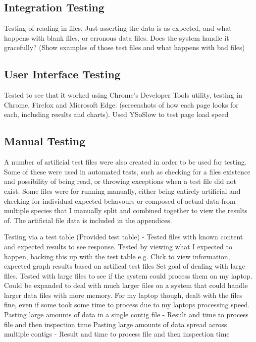 
\subsection{Integration Testing}
Testing of reading in files. Just asserting the data is as expected, and what happens with blank files, or erronous data files. Does the system handle it gracefully? (Show examples of those test files and what happens with bad files)


\subsection{User Interface Testing}
Tested to see that it worked using Chrome's Developer Tools utility, testing in Chrome, Firefox and Microsoft Edge. (screenshots of how each page looks for each, including results and charts). Used YSoSlow to test page load speed


\subsection{Manual Testing}
A number of artificial test files were also created in order to be used for testing. Some of these were used in automated tests, such as checking for a files existence and possibility of being read, or throwing exceptions when a test file did not exist. Some files were for running manually, either being entirely artificial and checking for individual expected behavours or composed of actual data from multiple species that I manually split and combined together to view the results of. The artificial file data is included in the appendices.

Testing via a test table (Provided test table) - Tested files with known content and expected results to see response. Tested by viewing what I expected to happen, backing this up with the test table e.g. Click to view information, expected graph results based on artifical test files
Set goal of dealing with large files. Tested with large files to see if the system could process them on my laptop. Could be expanded to deal with much larger files on a system that could handle larger data files with more memory. For my laptop though, dealt with the files fine, even if some took some time to process due to my laptops processing speed.
Pasting large amounts of data in a single contig file - Result and time to process file and then inspection time
Pasting large amounts of data spread across multiple contigs - Result and time to process file and then inspection time
